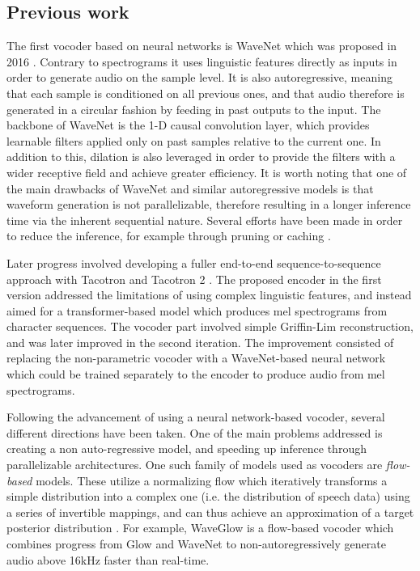 \documentclass{article}
\begin{document}
\subsection{Previous work}
The first vocoder based on neural networks is WaveNet which was proposed in 2016 \cite{oord2016wavenet}. Contrary to spectrograms it uses linguistic features directly as inputs in order to generate audio on the sample level. It is also autoregressive, meaning that each sample is conditioned on all previous ones, and that audio therefore is generated in a circular fashion by feeding in past outputs to the input. The backbone of WaveNet is the 1-D causal convolution layer, which provides learnable filters applied only on past samples relative to the current one. In addition to this, dilation is also leveraged in order to provide the filters with a wider receptive field and achieve greater efficiency. It is worth noting that one of the main drawbacks of WaveNet and similar autoregressive models is that waveform generation is not parallelizable, therefore resulting in a longer inference time via the inherent sequential nature. Several efforts have been made in order to reduce the inference, for example through pruning or caching \cite{kalchbrenner2018efficient, paine2016fast}.

Later progress involved developing a fuller end-to-end sequence-to-sequence approach with Tacotron \cite{wang2017tacotron} and Tacotron 2 \cite{shen2018natural}. The proposed encoder in the first version addressed the limitations of using complex linguistic features, and instead aimed for a transformer-based model which produces mel spectrograms from character sequences. The vocoder part involved simple Griffin-Lim reconstruction, and was later improved in the second iteration. The improvement consisted of replacing the non-parametric vocoder with a WaveNet-based neural network which could be trained separately to the encoder to produce audio from mel spectrograms.

Following the advancement of using a neural network-based vocoder, several different directions have been taken. One of the main problems addressed is creating a non auto-regressive model, and speeding up inference through parallelizable architectures. One such family of models used as vocoders are \textit{flow-based} models. These utilize a normalizing flow which iteratively transforms a simple distribution into a complex one (i.e. the distribution of speech data) using a series of invertible mappings, and can thus achieve an approximation of a target posterior distribution \cite{rezende2015variational}. For example, WaveGlow \cite{prenger2019waveglow} is a flow-based vocoder which combines progress from Glow \cite{kingma2018glow} and WaveNet to non-autoregressively generate audio above 16kHz faster than real-time. 
\end{document}
